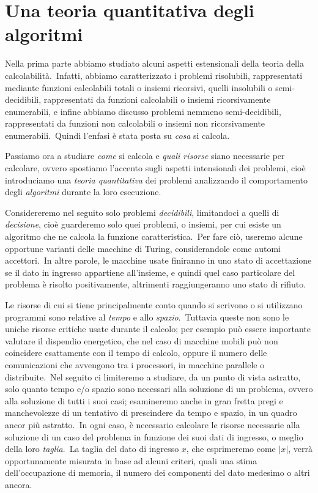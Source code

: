 \section{Una teoria quantitativa degli algoritmi}

Nella prima parte abbiamo studiato alcuni aspetti estensionali della teoria della calcolabilità.\
Infatti, abbiamo caratterizzato i problemi risolubili, rappresentati mediante funzioni calcolabili totali o insiemi ricorsivi, quelli insolubili o semi-decidibili, rappresentati da funzioni calcolabili o insiemi ricorsivamente enumerabili, e infine abbiamo discusso problemi nemmeno semi-decidibili, rappresentati da funzioni non calcolabili o insiemi non ricorsivamente enumerabili.\
Quindi l'enfasi è stata posta su \textit{cosa} si calcola.\

Passiamo ora a studiare \textit{come} si calcola e \textit{quali risorse} siano necessarie per calcolare, ovvero spostiamo l'accento sugli aspetti intensionali dei problemi, cioè introduciamo una \textit{teoria quantitativa} dei problemi analizzando il comportamento degli \textit{algoritmi} durante la loro esecuzione.\

Considereremo nel seguito solo problemi \textit{decidibili}, limitandoci a quelli di \textit{decisione}, cioè guarderemo solo quei problemi, o insiemi, per cui esiste un algoritmo che ne calcola la funzione caratteristica.\
Per fare ciò, useremo alcune opportune varianti delle macchine di Turing, considerandole come automi accettori.\
In altre parole, le macchine usate finiranno in uno stato di accettazione se il dato in ingresso appartiene all'insieme, e quindi quel caso particolare del problema è risolto positivamente, altrimenti raggiungeranno uno stato di rifiuto.\

Le risorse di cui si tiene principalmente conto quando si scrivono o si utilizzano programmi sono relative al \textit{tempo} e allo \textit{spazio}.\
Tuttavia queste non sono le uniche risorse critiche usate durante il calcolo; per esempio può essere importante valutare il dispendio energetico, che nel caso di macchine mobili può non coincidere esattamente con il tempo di calcolo, oppure il numero delle comunicazioni che avvengono tra i processori, in macchine parallele o distribuite.\
Nel seguito ci limiteremo a studiare, da un punto di vista astratto, solo quanto tempo e/o spazio sono necessari alla soluzione di un problema, ovvero alla soluzione di tutti i suoi casi; esamineremo anche in gran fretta pregi e manchevolezze di un tentativo di prescindere da tempo e spazio, in un quadro ancor più astratto.\
In ogni caso, è necessario calcolare le risorse necessarie alla soluzione di un caso del problema in funzione dei suoi dati di ingresso, o meglio della loro \textit{taglia}.\
La taglia del dato di ingresso $x$, che esprimeremo come $|x|$, verrà opportunamente misurata in base ad alcuni criteri, quali una stima dell'occupazione di memoria, il numero dei componenti del dato medesimo o altri ancora.\

